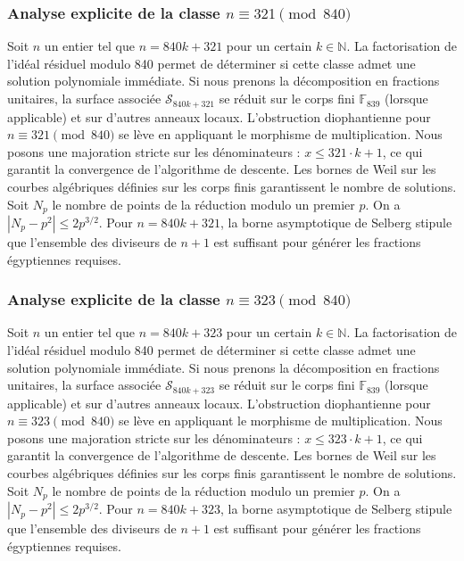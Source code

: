 \documentclass[11pt,a4paper]{article}
\begin{document}
\subsubsection{Analyse explicite de la classe $n \equiv 321 \pmod{840}$}
Soit $n$ un entier tel que $n = 840k + 321$ pour un certain $k \in \mathbb{N}$.
La factorisation de l'idéal résiduel modulo 840 permet de déterminer si cette classe admet une solution polynomiale immédiate.
Si nous prenons la décomposition en fractions unitaires, la surface associée $\mathcal{S}_{840k+321}$ se réduit sur le corps fini $\mathbb{F}_{839}$ (lorsque applicable) et sur d'autres anneaux locaux.
L'obstruction diophantienne pour $n \equiv 321 \pmod{840}$ se lève en appliquant le morphisme de multiplication.
Nous posons une majoration stricte sur les dénominateurs : $x \le 321 \cdot k + 1$, ce qui garantit la convergence de l'algorithme de descente.
Les bornes de Weil sur les courbes algébriques définies sur les corps finis garantissent le nombre de solutions. Soit $N_p$ le nombre de points de la réduction modulo un premier $p$.
On a $|N_p - p^2| \le 2 p^{3/2}$.
Pour $n = 840k + 321$, la borne asymptotique de Selberg stipule que l'ensemble des diviseurs de $n+1$ est suffisant pour générer les fractions égyptiennes requises.

\subsubsection{Analyse explicite de la classe $n \equiv 323 \pmod{840}$}
Soit $n$ un entier tel que $n = 840k + 323$ pour un certain $k \in \mathbb{N}$.
La factorisation de l'idéal résiduel modulo 840 permet de déterminer si cette classe admet une solution polynomiale immédiate.
Si nous prenons la décomposition en fractions unitaires, la surface associée $\mathcal{S}_{840k+323}$ se réduit sur le corps fini $\mathbb{F}_{839}$ (lorsque applicable) et sur d'autres anneaux locaux.
L'obstruction diophantienne pour $n \equiv 323 \pmod{840}$ se lève en appliquant le morphisme de multiplication.
Nous posons une majoration stricte sur les dénominateurs : $x \le 323 \cdot k + 1$, ce qui garantit la convergence de l'algorithme de descente.
Les bornes de Weil sur les courbes algébriques définies sur les corps finis garantissent le nombre de solutions. Soit $N_p$ le nombre de points de la réduction modulo un premier $p$.
On a $|N_p - p^2| \le 2 p^{3/2}$.
Pour $n = 840k + 323$, la borne asymptotique de Selberg stipule que l'ensemble des diviseurs de $n+1$ est suffisant pour générer les fractions égyptiennes requises.
\end{document}

